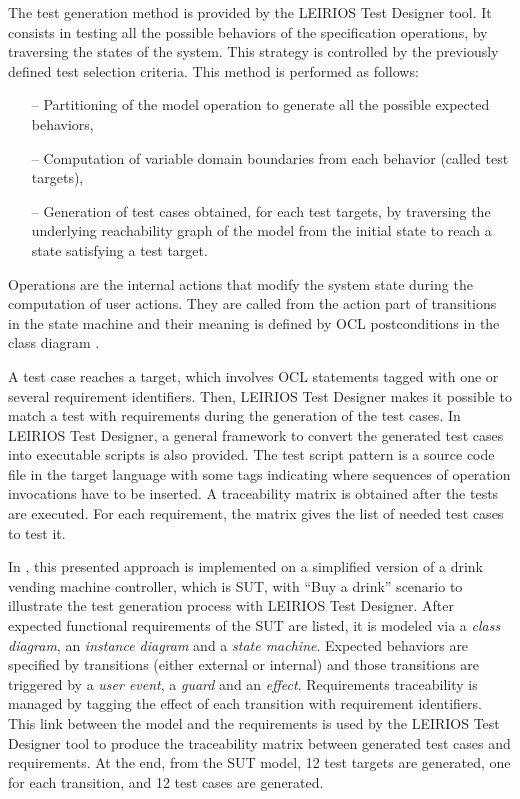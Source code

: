The test generation method is provided by the LEIRIOS Test Designer tool. It consists in testing all the possible behaviors of the specification operations, by traversing the states of the system. This strategy is controlled by the previously defined test selection criteria. 
\newpage
This method is performed as follows:
%
\begin{itemize}[noitemsep]
  \item [--]Partitioning of the model operation to generate all the possible expected behaviors,
  \item [--]Computation of variable domain boundaries from each behavior (called test targets),
   \item [--] Generation of test cases obtained, for each test targets, by traversing the underlying reachability graph of the model from the initial state to reach a state satisfying a test target.
\end{itemize}
Operations are the internal actions that modify the system state during the computation of user actions. They are called from the action part of transitions in the state machine and their meaning is defined by OCL postconditions in the class diagram \cite{LTG}. 

A test case reaches a target, which involves OCL statements tagged with one or several requirement identifiers. Then, LEIRIOS Test Designer makes it possible to match a test with requirements during the generation of the test cases. In LEIRIOS Test Designer, a general framework to convert the generated test cases into executable scripts is also provided. The test script pattern is a source code file in the target language with some tags indicating where sequences of operation invocations have to be inserted. A traceability matrix is obtained after the tests are executed. For each requirement, the matrix gives the list of needed test cases to test it. 

In \cite{Paper2}, this presented approach is implemented on a simplified version of a drink vending machine controller, which is SUT, with \enquote{Buy a drink} scenario to illustrate the test generation process with LEIRIOS Test Designer. After expected functional requirements of the SUT are listed, it is modeled via a \textit{class diagram}, an \textit{instance diagram} and a \textit{state machine}. Expected behaviors are specified by transitions (either external or internal) and those transitions are triggered by a \textit{user event}, a \textit{guard} and an \textit{effect}. Requirements traceability is managed by tagging the effect of each transition with requirement identifiers. This link between the model and the requirements is used by the LEIRIOS Test Designer tool to produce the traceability matrix between generated test cases and requirements. At the end, from the SUT model, 12 test targets are generated, one for each transition, and 12 test cases are generated. 


